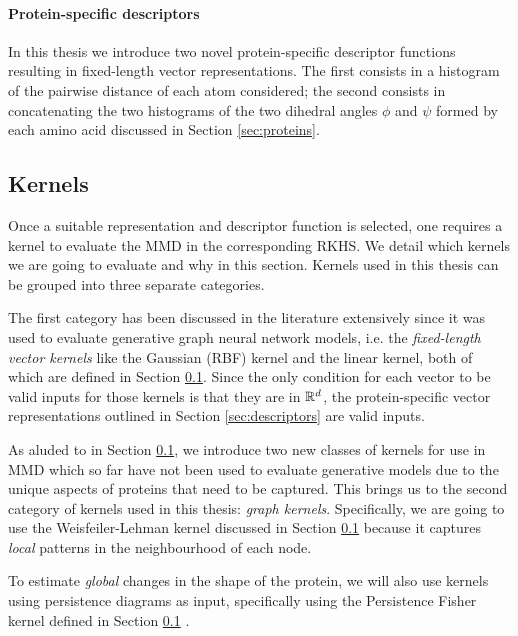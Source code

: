 \paragraph{Protein-specific descriptors} In this thesis we introduce
two novel protein-specific descriptor functions resulting in fixed-length vector
representations. The first consists in a histogram of the pairwise distance of
each atom considered; the second consists in concatenating the two histograms of
the two dihedral angles $\phi$ and $\psi$ formed by each amino acid discussed in Section
\ref{sec:proteins}.


\subsection{Kernels}\label{sec:kernels}
Once a suitable representation and descriptor function is selected, one requires
a kernel to evaluate the MMD in the corresponding RKHS. We detail which kernels
we are going to evaluate and why in this section. Kernels used in this thesis can be grouped into
three separate categories.

The first category has been discussed in the literature extensively since it was
used to evaluate generative graph neural network models, i.e. the
\emph{fixed-length vector kernels} like the Gaussian (RBF) kernel and the linear
kernel, both of which are defined in Section \ref{sec:kernels}. Since the only
condition for each vector to be valid inputs for those kernels is that they are
in $\mathbb{R}^d$, the protein-specific vector representations outlined in Section
\ref{sec:descriptors} are valid inputs.

As aluded to in Section \ref{sec:kernels}, we introduce two new classes of
kernels for use in MMD which so far have not been used to evaluate generative
models due to the unique aspects of proteins that need to be captured. This
brings us to the second category of kernels used in this thesis: \emph{graph kernels}.
Specifically, we are going to use the Weisfeiler-Lehman kernel discussed in
Section \ref{sec:kernels} because it captures \emph{local} patterns in the
neighbourhood of each node.

To estimate \emph{global} changes in the shape of the protein, we will also use
kernels using persistence diagrams as input, specifically using the Persistence
Fisher kernel defined in Section \ref{sec:kernels} \citep{le2018persistence}.

